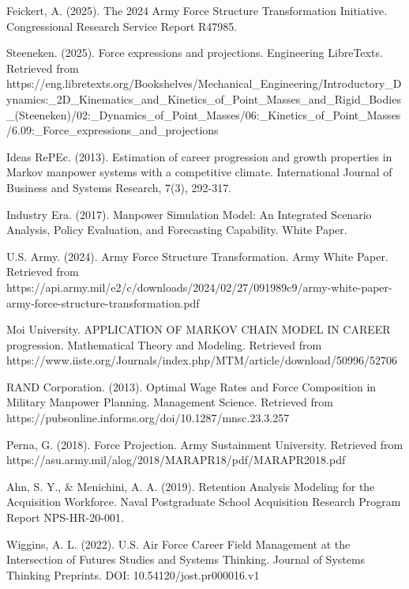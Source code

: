 \documentclass[main.tex]{subfiles}
\begin{document}
\begin{thebibliography}{21}
Feickert, A. (2025). The 2024 Army Force Structure Transformation Initiative. Congressional Research Service Report R47985.

Steeneken. (2025). Force expressions and projections. Engineering LibreTexts. Retrieved from https://eng.libretexts.org/Bookshelves/Mechanical\_Engineering/Introductory\_Dynamics:\_2D\_Kinematics\_and\_Kinetics\_of\_Point\_Masses\_and\_Rigid\_Bodies\_(Steeneken)/02:\_Dynamics\_of\_Point\_Masses/06:\_Kinetics\_of\_Point\_Masses/6.09:\_Force\_expressions\_and\_projections

Ideas RePEc. (2013). Estimation of career progression and growth properties in Markov manpower systems with a competitive climate. International Journal of Business and Systems Research, 7(3), 292-317.

Industry Era. (2017). Manpower Simulation Model: An Integrated Scenario Analysis, Policy Evaluation, and Forecasting Capability. White Paper.

U.S. Army. (2024). Army Force Structure Transformation. Army White Paper. Retrieved from https://api.army.mil/e2/c/downloads/2024/02/27/091989c9/army-white-paper-army-force-structure-transformation.pdf

Moi University. APPLICATION OF MARKOV CHAIN MODEL IN CAREER progression. Mathematical Theory and Modeling. Retrieved from https://www.iiste.org/Journals/index.php/MTM/article/download/50996/52706

RAND Corporation. (2013). Optimal Wage Rates and Force Composition in Military Manpower Planning. Management Science. Retrieved from https://pubsonline.informs.org/doi/10.1287/mnsc.23.3.257

Perna, G. (2018). Force Projection. Army Sustainment University. Retrieved from https://asu.army.mil/alog/2018/MARAPR18/pdf/MARAPR2018.pdf

Ahn, S. Y., \& Menichini, A. A. (2019). Retention Analysis Modeling for the Acquisition Workforce. Naval Postgraduate School Acquisition Research Program Report NPS-HR-20-001.

Wiggins, A. L. (2022). U.S. Air Force Career Field Management at the Intersection of Futures Studies and Systems Thinking. Journal of Systems Thinking Preprints. DOI: 10.54120/jost.pr000016.v1

\end{thebibliography}
\end{document}
